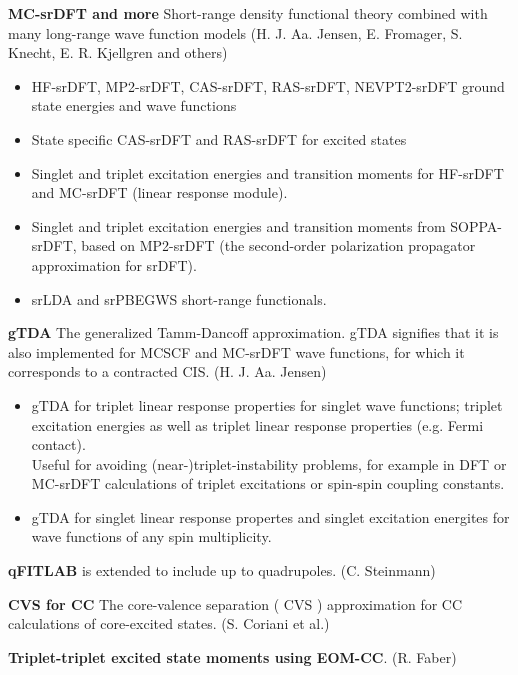 \begin{description}

\item{\bf MC-srDFT and more} Short-range density functional theory combined with many long-range wave function models
    (H. J. Aa. Jensen, E. Fromager, S. Knecht, E. R. Kjellgren and others)
    \begin{itemize}
  \item HF-srDFT, MP2-srDFT, CAS-srDFT, RAS-srDFT, NEVPT2-srDFT ground state energies and wave functions \\
  \item State specific CAS-srDFT and RAS-srDFT for excited states \\
  \item Singlet and triplet excitation energies and transition moments for HF-srDFT and MC-srDFT (linear response module).
  \item Singlet and triplet excitation energies and transition moments from SOPPA-srDFT, based on MP2-srDFT
  (the second-order polarization propagator approximation for srDFT).
  \item srLDA and srPBEGWS short-range functionals.
    \end{itemize}
\item{\bf gTDA} The generalized Tamm-Dancoff approximation.
   gTDA signifies that it is also implemented for MCSCF and MC-srDFT wave functions, for which it corresponds to a contracted CIS. (H. J. Aa. Jensen)
   \begin{itemize}
  \item gTDA for triplet linear response properties for singlet wave functions;
   triplet excitation energies as well as triplet linear response properties (e.g. Fermi contact).\\
   Useful for avoiding (near-)triplet-instability problems, for example in DFT or MC-srDFT calculations of triplet excitations or spin-spin coupling constants.
  \item gTDA for singlet linear response propertes and singlet excitation energites for wave functions of any spin multiplicity.
   \end{itemize}
\item{\bf qFITLAB} is extended to include up to quadrupoles. (C. Steinmann)
\item{\bf CVS for CC} The core-valence separation ( CVS ) approximation for CC calculations of core-excited states. (S. Coriani et al.)
\item{\bf Triplet-triplet excited state moments using EOM-CC}. (R. Faber)

\end{description}
